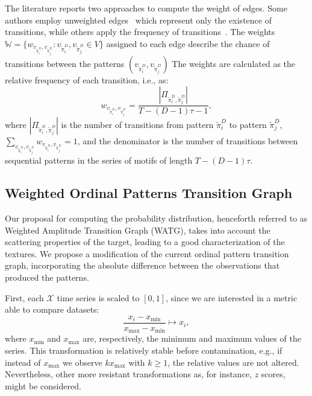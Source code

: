 \documentclass[journal]{IEEEtran}
\begin{document}
The literature reports two approaches to compute the weight of edges.
Some authors employ unweighted edges~\cite{McCullough2015lagged,Kulp2016ordinal} which represent only the existence of transitions, while others apply the frequency of transitions~\cite{Sorrentino2015periodic,Zhang2017ConstructingOP}.
The weights $\mathbb{W} = \{w_{v_{\widetilde{\pi}^D_i}, v_{\widetilde\pi^D_j}}: v_{\widetilde\pi^D_i}, v_{\widetilde\pi^D_j} \in V \}$ assigned to each edge describe the chance of transitions between the patterns $(v_{\widetilde\pi^D_i}, v_{\widetilde\pi^D_j})$
The weights are calculated as the relative frequency of each transition, i.e., as:
\begin{equation}
w_{v_{\widetilde\pi^D_i}, v_{\widetilde\pi^D_j}} = \frac{|\Pi_{\widetilde\pi^D_i,\widetilde\pi^D_j}|}{T-(D-1)\tau-1},
\end{equation}
where $|\Pi_{\widetilde\pi^D_i,\widetilde\pi^D_j}|$ is the number of transitions from pattern $\widetilde\pi^D_i$ to pattern $\widetilde\pi^D_j$, $\sum_{v_{\widetilde\pi^D_i}, v_{\widetilde\pi^D_j}}w_{v_{\widetilde\pi^D_i}, v_{\widetilde\pi^D_j}} = 1$,
and the denominator is the number of transitions between sequential patterns in the series of motifs of length $T-(D-1)\tau$.

\subsection{Weighted Ordinal Patterns Transition Graph}\label{WATG}

Our proposal for computing the probability distribution, henceforth referred to as Weighted Amplitude Transition Graph (WATG), takes into account the scattering properties of the target, leading to a good characterization of the textures.
We propose a modification of the current ordinal pattern transition graph, incorporating the absolute difference between the observations that produced the patterns.%

First, each $\mathcal{X}$ time series is scaled to $[0, 1]$, since we are interested in a metric able to compare datasets:
\begin{equation}
\frac{x_i - x_{\min}}{x_{\max} - x_{\min}} \longmapsto x_i,
\end{equation}
where $x_{\min}$ and $x_{\max}$ are, respectively, the minimum and maximum values of the series.
This transformation is relatively stable before contamination, e.g., if instead of $x_{\max}$ we observe $k x_{\max}$ with $k\geq 1$, the relative values are not altered. Nevertheless, other more resistant transformations as, for instance, $z$ scores, might be considered.
\end{document}
